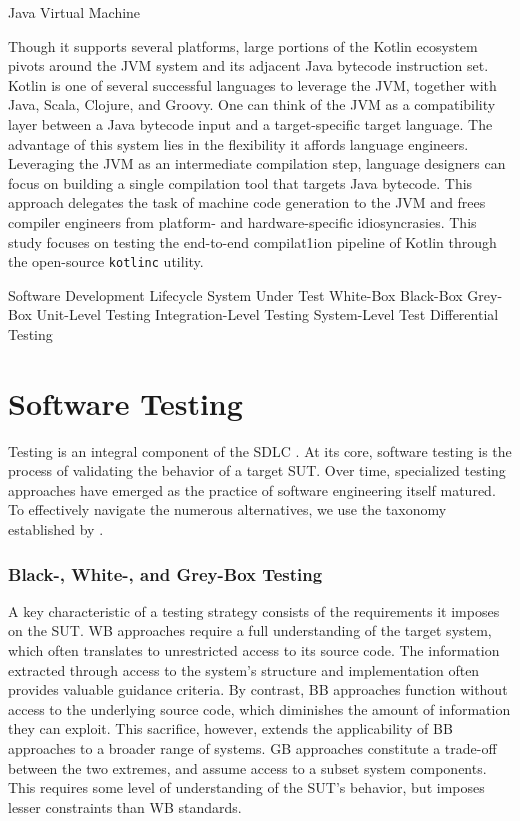  {Java Virtual Machine}

Though it supports several platforms, large portions of the Kotlin ecosystem pivots around
the \Gls{JVM} system and its adjacent Java bytecode instruction set.
Kotlin is one of several successful languages to leverage the \gls{JVM},
together with Java, Scala, Clojure, and Groovy. 
One can think of the \gls{JVM} as a compatibility layer
between a Java bytecode input and a target-specific target language.
The advantage of this system lies in the flexibility it affords
language engineers.
Leveraging the \gls{JVM} as an intermediate compilation step,
language designers can focus on building a single compilation tool
that targets Java bytecode.
This approach delegates the task of machine code
generation to the \gls{JVM} and frees compiler engineers from
platform- and hardware-specific idiosyncrasies.
This study focuses on testing the end-to-end compilat1ion pipeline
of Kotlin through the open-source \texttt{kotlinc} utility.



 {Software Development Lifecycle}
 {System Under Test}
 {White-Box}
 {Black-Box}
 {Grey-Box}
 {Unit-Level Testing}
 {Integration-Level Testing}
 {System-Level Test}
 {Differential Testing}

\section{Software Testing}

Testing is an integral component of the \gls{SDLC} \cite{jamil2016software}.
At its core, software testing is the process of validating
the behavior of a target \gls{SUT}. 
Over time, specialized testing approaches have emerged as
the practice of software engineering itself matured.
To effectively navigate the numerous alternatives, we use the
taxonomy established by \citet{umar2020comprehensive}.

\subsubsection{Black-, White-, and Grey-Box Testing}

A key characteristic of a testing strategy consists of 
the requirements it imposes on the \gls{SUT}. 
\Gls{WB} approaches require a full understanding of the target
system, which often translates to unrestricted access to its source code.
The information extracted through access to the system's structure
and implementation often provides valuable guidance criteria.
By contrast, \Gls{BB} approaches function without access to the underlying
source code, which diminishes the amount of information they can exploit.
This sacrifice, however, extends the applicability of \gls{BB} approaches 
to a broader range of systems.
\Gls{GB} approaches constitute a trade-off between the two 
extremes, and assume access to a subset system components.
This requires some level of understanding of the \gls{SUT}'s
behavior, but imposes lesser constraints than \gls{WB} standards.

